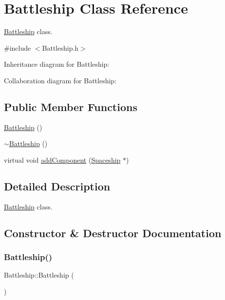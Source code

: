 \hypertarget{classBattleship}{}\section{Battleship Class Reference}
\label{classBattleship}


\hyperlink{classBattleship}{Battleship} class.  




{\ttfamily \#include $<$Battleship.\+h$>$}



Inheritance diagram for Battleship\+:


Collaboration diagram for Battleship\+:
\subsection*{Public Member Functions}
\begin{DoxyCompactItemize}
\item 
\hyperlink{classBattleship_a57a0db9eadfe53049035b3b0e5ec5367}{Battleship} ()
\item 
\hyperlink{classBattleship_a89425138ec38aec5ea9da7889445dc27}{$\sim$\+Battleship} ()
\item 
virtual void \hyperlink{classBattleship_a975ecf4aaef329705c1e1b3a4584a302}{add\+Component} (\hyperlink{classSpaceship}{Spaceship} $\ast$)
\end{DoxyCompactItemize}


\subsection{Detailed Description}
\hyperlink{classBattleship}{Battleship} class. 

\subsection{Constructor \& Destructor Documentation}
\mbox{\label{classBattleship_a57a0db9eadfe53049035b3b0e5ec5367}} 
\subsubsection{\texorpdfstring{Battleship()}{Battleship()}}
{\footnotesize\ttfamily Battleship\+::\+Battleship (\begin{DoxyParamCaption}{ }\end{DoxyParamCaption})\hspace{0.3cm}{\ttfamily [inline]}}

